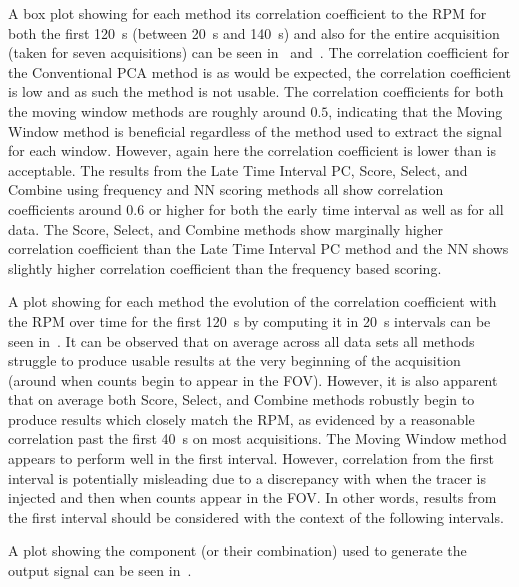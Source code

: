             A box plot showing for each method its correlation coefficient to the \gls{RPM} for both the first \SI{120}{\second} (between \SI{20}{\second} and \SI{140}{\second}) and also for the entire acquisition (taken for seven acquisitions) can be seen in~ and~. The correlation coefficient for the Conventional \gls{PCA} method is as would be expected, the correlation coefficient is low and as such the method is not usable. The correlation coefficients for both the moving window methods are roughly around $0.5$, indicating  that the Moving Window method is beneficial regardless of the method used to extract the signal for each window. However, again here the correlation coefficient is lower than is acceptable. The results from the Late Time Interval \gls{PC}, Score, Select, and Combine using frequency and \gls{NN} scoring methods all show correlation coefficients around $0.6$ or higher for both the early time interval as well as for all data. The Score, Select, and Combine methods show marginally higher correlation coefficient than the Late Time Interval \gls{PC} method and the \gls{NN} shows slightly higher correlation coefficient than the frequency based scoring.
            
            A plot showing for each method the evolution of the correlation coefficient with the \gls{RPM} over time for the first \SI{120}{\second} by computing it in \SI{20}{\second} intervals can be seen in~. It can be observed that on average across all data sets all methods struggle to produce usable results at the very beginning of the acquisition (around when counts begin to appear in the \gls{FOV}). However, it is also apparent that on average both Score, Select, and Combine methods robustly begin to produce results which closely match the \gls{RPM}, as evidenced by a reasonable correlation past the first \SI{40}{\second} on most acquisitions. The Moving Window method appears to perform well in the first interval. However, correlation from the first interval is potentially misleading due to a discrepancy with when the tracer is injected and then when counts appear in the \gls{FOV}. In other words, results from the first interval should be considered with the context of the following intervals.
            
            A plot showing the component (or their combination) used to generate the output signal can be seen in~.
        
